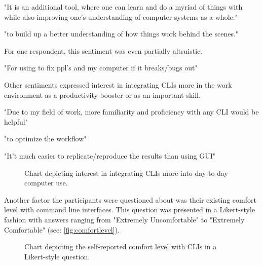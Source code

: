 \begin{quotes}
	"It is an additional tool, where one can learn and do a myriad of things with while also
	improving one's understanding of computer systems as a whole."
\end{quotes}

\begin{quotes}
	"to build up a better understanding of how things work behind the scenes."
\end{quotes}

For one respondent, this sentiment was even partially altruistic.

\begin{quotes}
	"For using to fix ppl's and my computer if it breaks/bugs out"
\end{quotes}

Other sentiments expressed interest in integrating CLIs more in the work
environment as a productivity booster or as an important skill.


\begin{quotes}
	"Due to my field of work, more familiarity and proficiency with any CLI would be helpful"
\end{quotes}

\begin{quotes}
	"to optimize the workflow"
\end{quotes}

\begin{quotes}
	"It't much easier to replicate/reproduce the results than using GUI"
\end{quotes}

\begin{figure}[htbp]
	\scalebox{0.65}{}
	\caption{Chart depicting interest in integrating CLIs more into day-to-day computer use.}
	\label{fig:daytoday}
\end{figure}

Another factor the participants were questioned about was their existing
comfort level with command line interfaces. This question was presented in a
Likert-style fashion with answers ranging from "Extremely Uncomfortable" to
"Extremely Comfortable" (see: \autoref{fig:comfortlevel}).

\begin{figure}[H]
	\scalebox{0.72}{}
	\caption{Chart depicting the self-reported comfort level with CLIs in a Likert-style question.}
	\label{fig:comfortlevel}
\end{figure}

